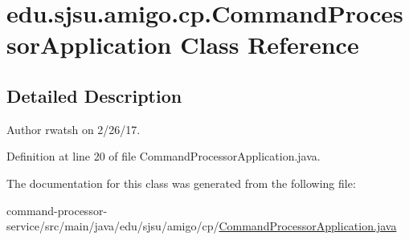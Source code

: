 \hypertarget{classedu_1_1sjsu_1_1amigo_1_1cp_1_1_command_processor_application}{}\section{edu.\+sjsu.\+amigo.\+cp.\+Command\+Processor\+Application Class Reference}
\label{classedu_1_1sjsu_1_1amigo_1_1cp_1_1_command_processor_application}


\subsection{Detailed Description}
\begin{DoxyAuthor}{Author}
rwatsh on 2/26/17. 
\end{DoxyAuthor}


Definition at line 20 of file Command\+Processor\+Application.\+java.



The documentation for this class was generated from the following file\+:\begin{DoxyCompactItemize}
\item 
command-\/processor-\/service/src/main/java/edu/sjsu/amigo/cp/\hyperlink{_command_processor_application_8java}{Command\+Processor\+Application.\+java}\end{DoxyCompactItemize}
